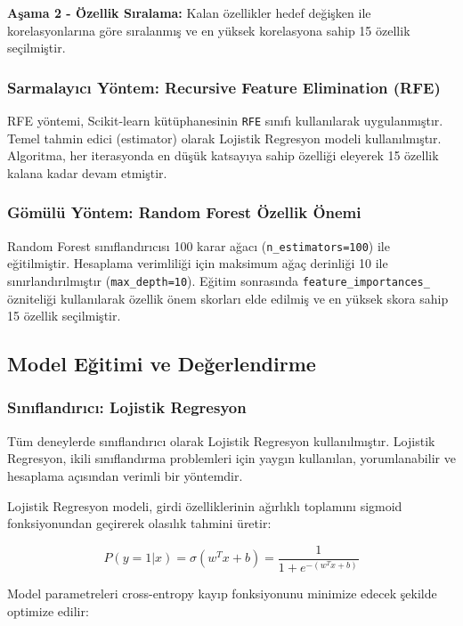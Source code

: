 \documentclass[conference]{IEEEtran}
\begin{document}
\textbf{Aşama 2 - Özellik Sıralama:} Kalan özellikler hedef değişken ile korelasyonlarına göre sıralanmış ve en yüksek korelasyona sahip 15 özellik seçilmiştir.

\subsubsection{Sarmalayıcı Yöntem: Recursive Feature Elimination (RFE)}

RFE yöntemi, Scikit-learn kütüphanesinin \texttt{RFE} sınıfı kullanılarak uygulanmıştır. Temel tahmin edici (estimator) olarak Lojistik Regresyon modeli kullanılmıştır. Algoritma, her iterasyonda en düşük katsayıya sahip özelliği eleyerek 15 özellik kalana kadar devam etmiştir.

\subsubsection{Gömülü Yöntem: Random Forest Özellik Önemi}

Random Forest sınıflandırıcısı 100 karar ağacı (\texttt{n\_estimators=100}) ile eğitilmiştir. Hesaplama verimliliği için maksimum ağaç derinliği 10 ile sınırlandırılmıştır (\texttt{max\_depth=10}). Eğitim sonrasında \texttt{feature\_importances\_} özniteliği kullanılarak özellik önem skorları elde edilmiş ve en yüksek skora sahip 15 özellik seçilmiştir.

\subsection{Model Eğitimi ve Değerlendirme}

\subsubsection{Sınıflandırıcı: Lojistik Regresyon}

Tüm deneylerde sınıflandırıcı olarak Lojistik Regresyon kullanılmıştır. Lojistik Regresyon, ikili sınıflandırma problemleri için yaygın kullanılan, yorumlanabilir ve hesaplama açısından verimli bir yöntemdir.

Lojistik Regresyon modeli, girdi özelliklerinin ağırlıklı toplamını sigmoid fonksiyonundan geçirerek olasılık tahmini üretir:

\begin{equation}
    P(y=1|x) = \sigma(w^T x + b) = \frac{1}{1 + e^{-(w^T x + b)}}
\end{equation}

Model parametreleri cross-entropy kayıp fonksiyonunu minimize edecek şekilde optimize edilir:
\end{document}
